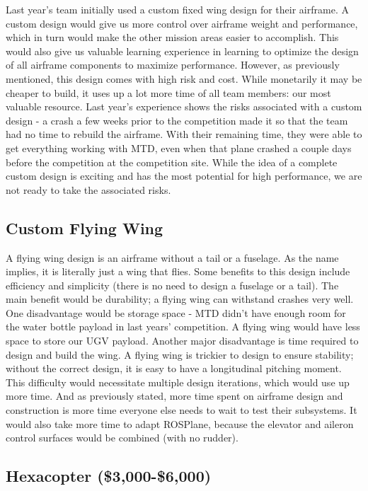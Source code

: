 \documentclass[]{auvsi_doc}
\begin{document}
Last year's team initially used a custom fixed wing design for their airframe. A custom design would give us more control over airframe weight and performance, which in turn would make the other mission areas easier to accomplish. This would also give us valuable learning experience in learning to optimize the design of all airframe components to maximize performance. However, as previously mentioned, this design comes with high risk and cost. While monetarily it may be cheaper to build, it uses up a lot more time of all team members: our most valuable resource. Last year's experience shows the risks associated with a custom design - a crash a few weeks prior to the competition made it so that the team had no time to rebuild the airframe. With their remaining time, they were able to get everything working with MTD, even when that plane crashed a couple days before the competition at the competition site. While the idea of a complete custom design is exciting and has the most potential for high performance, we are not ready to take the associated risks.

\subsection{Custom Flying Wing}
	
	A flying wing design is an airframe without a tail or a fuselage. As the name implies, it is literally just a wing that flies. Some benefits to this design include efficiency and simplicity (there is no need to design a fuselage or a tail). The main benefit would be durability; a flying wing can withstand crashes very well. One disadvantage would be storage space - MTD didn't have enough room for the water bottle payload in last years' competition. A flying wing would have less space to store our UGV payload. Another major disadvantage is time required to design and build the wing. A flying wing is trickier to design to ensure stability; without the correct design, it is easy to have a longitudinal pitching moment. This difficulty would necessitate multiple design iterations, which would use up more time. And as previously stated, more time spent on airframe design and construction is more time everyone else needs to wait to test their subsystems. It would also take more time to adapt ROSPlane, because the elevator and aileron control surfaces would be combined (with no rudder).

\subsection{Hexacopter (\$3,000-\$6,000)}
\end{document}

